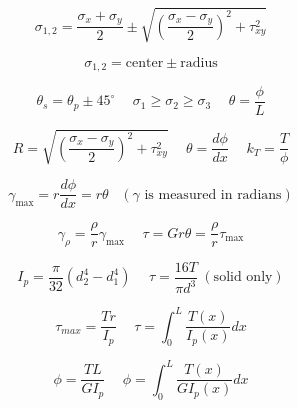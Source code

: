 \documentclass[twocolumn, 12pt]{article}
\begin{document}
{\begin{equation*}
    \sigma_{1,2} =\frac{\sigma_x+\sigma_y}{2} \pm \sqrt{\left(\frac{\sigma_x-\sigma_y}{2}\right)^2 +\tau_{xy}^2} 
\end{equation*}

\begin{equation*}
    \sigma_{1,2}=\text{center} \pm \text{radius}
\end{equation*}

\begin{equation*}
    \theta_s=\theta_p \pm 45^\circ \hspace{15pt} \sigma_1 \geq \sigma_2 \geq \sigma_3 \hspace{15pt} \theta=\frac{\phi}{L}
\end{equation*}

\begin{equation*}
    R=\sqrt{\left(\frac{\sigma_x-\sigma_y}{2}\right)^2 +\tau_{xy}^2 } \hspace{15pt}  \theta=\frac{d\phi}{dx} \hspace{15pt} k_T=\frac{T}{\phi}
\end{equation*}

\begin{equation*}
    \gamma_{\text{max}} =r\frac{d\phi}{dx}=r\theta  \hspace{10pt} (\gamma \text{ is measured in radians}) 
\end{equation*}

\begin{equation*}
    \gamma_\rho =\frac{\rho}{r}\gamma_{\text{max}} \hspace{15pt} \tau= Gr\theta= \frac{\rho}{r}\tau_{\text{max}}
\end{equation*}

\begin{equation*}
    I_p=\frac{\pi}{32}(d^4_2 -d^4_1) \hspace{15pt} \tau=\frac{16T}{\pi d^3} \hspace{3pt} (\text{solid only})
\end{equation*}

\begin{equation*}
    \tau_{max} =\frac{Tr}{I_p} \hspace{15pt} \tau =\int_0^L\frac{T(x)}{I_p(x)}dx
\end{equation*}

\begin{equation*}
    \phi=\frac{TL}{GI_p} \hspace{15pt}  \phi= \int_0^L \frac{T(x)}{GI_p(x)}dx
\end{equation*}

}
\end{document}
